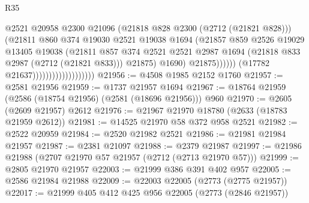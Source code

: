 \begin{lexlean}{R35}
\begin{coremodule}
                                                  @2521
                                                  @20958
                                                  @2300
                                                  @21096
                                                  (@21818 @828 @2300 (@2712 (@21821 @828)))
                                                  (@21811
                                                    @860
                                                    @374
                                                    @19030
                                                    @2521
                                                    @19038
                                                    @1694
                                                    (@21857
                                                      @859
                                                      @2526
                                                      @19029
                                                      @13405
                                                      @19038
                                                      (@21811
                                                        @857
                                                        @374
                                                        @2521
                                                        @2521
                                                        @2987
                                                        @1694
                                                        (@21818 @833 @2987 (@2712 (@21821 @833)))
                                                        @21875)
                                                      @1690)
                                                    @21875))))))
                                        (@17782 @21637)))))))))))))))))))
@21956 := @4508 @1985 @2152 @1760
@21957 := @2581 @21956
@21959 := @1737 @21957 @1694
@21967 := @18764 @21959 (@2586 (@18754 @21956) (@2581 (@18696 @21956))) @960
@21970 := @2605 (@2609 @21957) @2612
@21976 := @21967 @21970 @18780 (@2633 (@18783 @21959 @2612))
@21981 := @14525 @21970 @58 @372 @958 @2521
@21982 := @2522 @20959
@21984 := @2520 @21982 @2521
@21986 := @21981 @21984 @21957
@21987 := @2381 @21097
@21988 := @2379 @21987
@21997 := @21986 @21988 (@2707 @21970 @57 @21957 (@2712 (@2713 @21970 @57)))
@21999 := @2805 @21970 @21957
@22003 := @21999 @386 @391 @402 @957
@22005 := @2586 @21984 @21988
@22009 := @22003 @22005 (@2773 (@2775 @21957))
@22017 := @21999 @405 @412 @425 @956 @22005 (@2773 (@2846 @21957))

\end{coremodule}
\end{lexlean}
